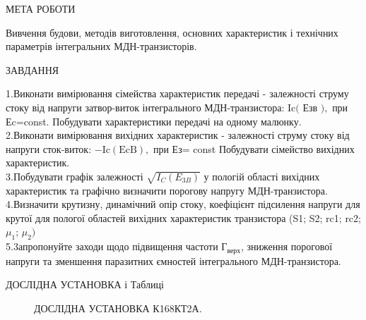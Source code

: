 \documentclass[a4paper,14pt]{extreport}
\begin{document}
\begin{center} МЕТА РОБОТИ\\ \end{center}

Вивчення будови, методів виготовлення, основних характеристик і технічних параметрів інтегральних МДН-транзисторів.

\begin{center}ЗАВДАННЯ\\ \end{center}


1.Виконати вимірювання сімейства характеристик передачі - залежності струму стоку від напруги затвор-виток інтегрального МДН-транзистора: $\mathrm{Ic}($ Езв $),$ при Еc=const. Побудувати характеристики передачі на одному малюнку.\\

2.Виконати вимірювання вихідних характеристик - залежності струму стоку від напруги сток-виток: $-\mathrm{Ic}(\mathrm{EcB}),$ при Ез= const Побудувати сімейство вихідних характеристик.\\

3.Побудувати графік залежності $\sqrt{I_{C}\left(E_{3 B}\right)}$ у пологій області вихідних характеристик та графічно визначити порогову напругу МДН-транзистора.\\

4.Визначити крутизну, динамічний опір стоку, коефіцієнт підсилення напруги для крутої для пологої областей вихідних характеристик транзистора (S1; S2; rc1; rc2; $\mu_{1}$; $\mu_{2})$\\

5.3апропонуйте заходи щодо підвищення частоти Г$_{\text{верх}}$, зниження порогової напруги та зменшення паразитних ємностей інтегрального МДН-транзистора.\\

\newpage
\begin{center}ДОСЛІДНА УСТАНОВКА і Таблиці\\ \end{center}
\begin{figure}[h]
\caption{ДОСЛІДНА УСТАНОВКА К168КТ2А.}
\label{ris1}
\end{figure}
\end{document}
